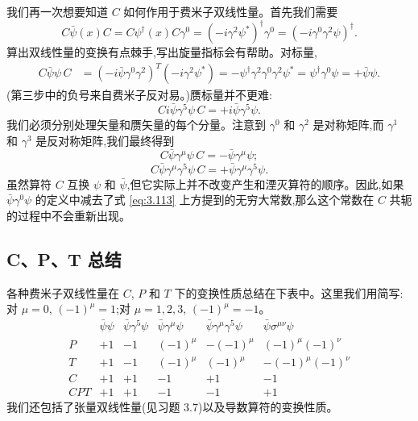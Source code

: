 我们再一次想要知道 $C$ 如何作用于费米子双线性量。首先我们需要
\begin{equation}
  C\bar{\psi}(x)C = C\psi^{\dagger}(x)C\gamma^0
    = (-i\gamma^2\psi^{*})^{\dagger}\gamma^0
    = (-i\gamma^0\gamma^2\psi)^{\dagger} .
  \label{eq:3.137}
\end{equation}
算出双线性量的变换有点棘手,写出旋量指标会有帮助。对标量,
\begin{align}
  C\bar{\psi}\psi\,C &= (-i\bar{\psi}\gamma^0\gamma^2)^T(-i\gamma^2\psi^{*})
    = -\psi^{\dagger}\gamma^2\gamma^0\gamma^2\psi^{*}
    = \psi^{\dagger}\gamma^0\psi
    = +\bar{\psi}\psi .
  \label{eq:3.138}
\end{align}
(第三步中的负号来自费米子反对易。)赝标量并不更难:
\begin{equation}
  Ci\bar{\psi}\gamma^5\psi\,C = +i\bar{\psi}\gamma^5\psi .
  \label{eq:3.139}
\end{equation}
我们必须分别处理矢量和赝矢量的每个分量。注意到 $\gamma^0$ 和 $\gamma^2$ 是对称矩阵,而 $\gamma^1$ 和 $\gamma^3$ 是反对称矩阵,我们最终得到
\begin{equation}
  C\bar{\psi}\gamma^\mu\psi\,C = -\bar{\psi}\gamma^\mu\psi;
  \label{eq:3.140}
\end{equation}
\begin{equation}
  C\bar{\psi}\gamma^\mu\gamma^5\psi\,C = +\bar{\psi}\gamma^\mu\gamma^5\psi .
  \label{eq:3.141}
\end{equation}
虽然算符 $C$ 互换 $\psi$ 和 $\bar{\psi}$,但它实际上并不改变产生和湮灭算符的顺序。因此,如果 $\bar{\psi}\gamma^0\psi$ 的定义中减去了式 \eqref{eq:3.113} 上方提到的无穷大常数,那么这个常数在 $C$ 共轭的过程中不会重新出现。

\subsection{C、P、T 总结}

各种费米子双线性量在 $C$, $P$ 和 $T$ 下的变换性质总结在下表中。这里我们用简写:对 $\mu = 0$, $(-1)^\mu = 1$;对 $\mu = 1, 2, 3$, $(-1)^\mu = -1$。
\begin{equation}
  \begin{array}{c|ccccc}
    & \bar{\psi}\psi & \bar{\psi}\gamma^5\psi
      & \bar{\psi}\gamma^\mu\psi & \bar{\psi}\gamma^\mu\gamma^5\psi
      & \bar{\psi}\sigma^{\mu\nu}\psi\\
    \hline
    P & +1 & -1 & (-1)^\mu & -(-1)^\mu & (-1)^\mu(-1)^\nu\\
    T & +1 & -1 & (-1)^\mu & (-1)^\mu & -(-1)^\mu(-1)^\nu\\
    C & +1 & +1 & -1 & +1 & -1\\
    CPT & +1 & +1 & -1 & -1 & +1
  \end{array}
  \label{eq:3.142}
\end{equation}
我们还包括了张量双线性量(见习题 3.7)以及导数算符的变换性质。

